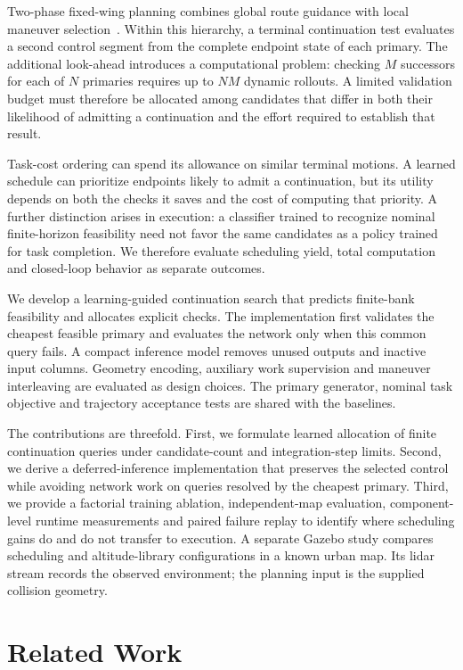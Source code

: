 \documentclass[journal]{IEEEtran}
\begin{document}
Two-phase fixed-wing planning combines global route guidance with local maneuver selection~\cite{tan2022twophase,tan2026twophase}. Within this hierarchy, a terminal continuation test evaluates a second control segment from the complete endpoint state of each primary. The additional look-ahead introduces a computational problem: checking $M$ successors for each of $N$ primaries requires up to $NM$ dynamic rollouts. A limited validation budget must therefore be allocated among candidates that differ in both their likelihood of admitting a continuation and the effort required to establish that result.

Task-cost ordering can spend its allowance on similar terminal motions. A learned schedule can prioritize endpoints likely to admit a continuation, but its utility depends on both the checks it saves and the cost of computing that priority. A further distinction arises in execution: a classifier trained to recognize nominal finite-horizon feasibility need not favor the same candidates as a policy trained for task completion. We therefore evaluate scheduling yield, total computation and closed-loop behavior as separate outcomes.

We develop a learning-guided continuation search that predicts finite-bank feasibility and allocates explicit checks. The implementation first validates the cheapest feasible primary and evaluates the network only when this common query fails. A compact inference model removes unused outputs and inactive input columns. Geometry encoding, auxiliary work supervision and maneuver interleaving are evaluated as design choices. The primary generator, nominal task objective and trajectory acceptance tests are shared with the baselines.

The contributions are threefold. First, we formulate learned allocation of finite continuation queries under candidate-count and integration-step limits. Second, we derive a deferred-inference implementation that preserves the selected control while avoiding network work on queries resolved by the cheapest primary. Third, we provide a factorial training ablation, independent-map evaluation, component-level runtime measurements and paired failure replay to identify where scheduling gains do and do not transfer to execution. A separate Gazebo study compares scheduling and altitude-library configurations in a known urban map. Its lidar stream records the observed environment; the planning input is the supplied collision geometry.

\section{Related Work}
\end{document}
